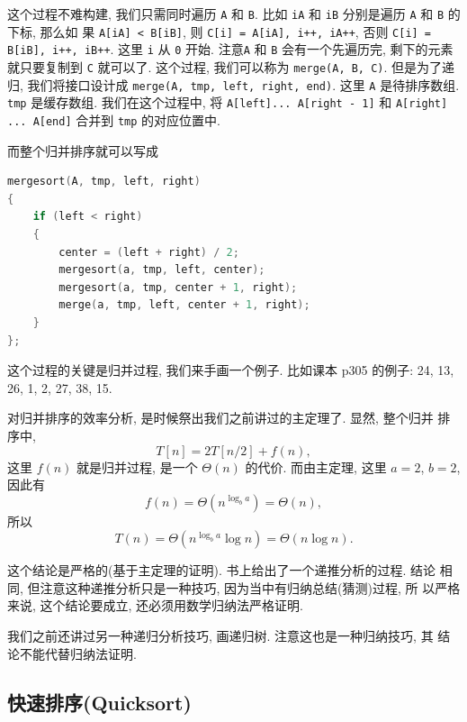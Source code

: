 \documentclass[a4paper]{ctexart}
\theoremstyle{definition}
\theoremstyle{definition}
\begin{document}
这个过程不难构建, 我们只需同时遍历 \verb|A| 和 \verb|B|. 比如
\verb|iA| 和 \verb|iB| 分别是遍历 \verb|A| 和 \verb|B| 的下标, 那么如
果 \verb|A[iA] < B[iB]|, 则\newline
\verb|C[i] = A[iA], i++, iA++|, \newline
否则 \newline
\verb|C[i] = B[iB], i++, iB++|. \newline
这里 \verb|i| 从 \verb|0| 开始. 注意\verb|A| 和 \verb|B| 会有一个先遍历完,
剩下的元素就只要复制到 \verb|C| 就可以了. 这个过程, 我们可以称为\newline
\verb|merge(A, B, C)|. \newline
但是为了递归, 我们将接口设计成\newline
\verb|merge(A, tmp, left, right, end)|. \newline
这里 \verb|A| 是待排序数组. \verb|tmp| 是缓存数组. 我们在这个过程中, 将\newline
\verb|A[left]... A[right - 1]| \newline
和
\newline \verb|A[right] ... A[end]| \newline
合并到 \verb|tmp| 的对应位置中.

而整个归并排序就可以写成

\begin{lstlisting}[language=C++]
mergesort(A, tmp, left, right)
{
	if (left < right)
	{
		center = (left + right) / 2;
		mergesort(a, tmp, left, center);
		mergesort(a, tmp, center + 1, right);
		merge(a, tmp, left, center + 1, right);
	}
};
\end{lstlisting}

这个过程的关键是归并过程, 我们来手画一个例子. 比如课本 p305 的例子:
24, 13, 26, 1, 2, 27, 38, 15.

对归并排序的效率分析, 是时候祭出我们之前讲过的主定理了. 显然, 整个归并
排序中,
$$
T[n] = 2 T[n / 2] + f(n),
$$
这里 $f(n)$ 就是归并过程, 是一个 $\Theta(n)$ 的代价. 而由主定理, 这里
$a = 2$, $b = 2$, 因此有
$$
f(n) = \Theta(n^{\log_ba}) = \Theta(n),
$$
所以
$$
T(n) = \Theta(n^{\log_ba}\log n) = \Theta(n \log n).
$$

这个结论是严格的(基于主定理的证明). 书上给出了一个递推分析的过程. 结论
相同, 但注意这种递推分析只是一种技巧, 因为当中有归纳总结(猜测)过程, 所
以严格来说, 这个结论要成立, 还必须用数学归纳法严格证明.

我们之前还讲过另一种递归分析技巧, 画递归树. 注意这也是一种归纳技巧, 其
结论不能代替归纳法证明.

\subsection{快速排序(Quicksort)}
\end{document}
